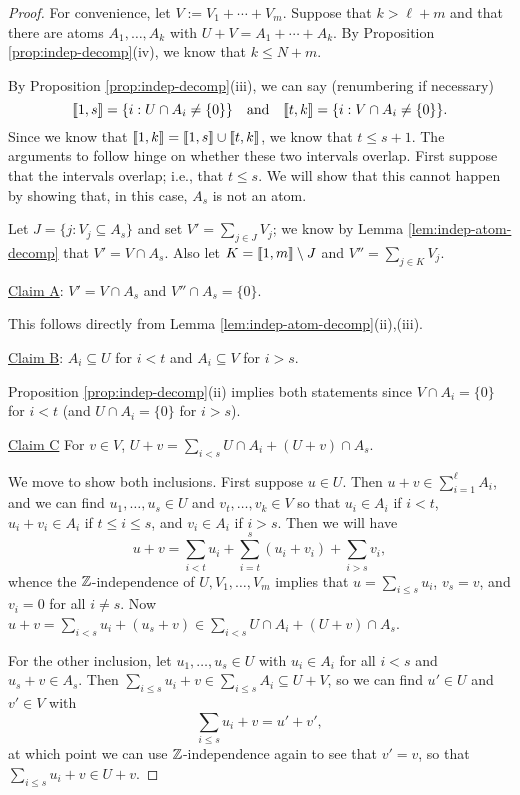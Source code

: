 \begin{proof}
For convenience, let $V := V_1 + \cdots + V_m$.
Suppose that $k > \ell + m$ and that there are atoms $A_1,\dots,A_k$ with $U+V = A_1 + \cdots + A_k$.
By Proposition \ref{prop:indep-decomp}(iv), we know that $k \le N+m$.

By Proposition \ref{prop:indep-decomp}(iii), we can say (renumbering if necessary)
\[ \llbracket 1,s \rrbracket =  \{ i: U\cap A_i \neq\{0\}\} \quad \textrm{and} \quad \llbracket t,k \rrbracket = \{i: V\cap A_i \neq \{0\}\}. \]
Since we know that $\llbracket 1,k \rrbracket = \llbracket 1,s \rrbracket \cup \llbracket t,k \rrbracket$, we know that $t \le s+1$.
The arguments to follow hinge on whether these two intervals overlap.  
First suppose that the intervals overlap; i.e., that $t \le s$.
We will show that this cannot happen by showing that, in this case, $A_s$ is not an atom.

Let $J = \{ j: V_j \subseteq A_s \}$ and set $V' = \sum_{j\in J} V_j$; we know by Lemma \ref{lem:indep-atom-decomp} that $V' = V \cap A_s$.
Also let $K = \llbracket 1,m \rrbracket \setminus J$ and $V'' = \sum_{j\in K} V_j$.

\noindent\underline{Claim A}: $V' = V\cap A_s$ and $V'' \cap A_s = \{0\}$. \label{cla}

This follows directly from Lemma \ref{lem:indep-atom-decomp}(ii),(iii).

\noindent\underline{Claim B}: $A_i \subseteq U$ for $i<t$ and $A_i \subseteq V$ for $i > s$. \label{clb}

Proposition \ref{prop:indep-decomp}(ii) implies both statements since $V \cap A_i = \{0\}$ for $i<t$ (and $U\cap A_i = \{0\}$ for $i>s$).

\noindent\underline{Claim C} For $v\in V$, $U+v = \sum\limits_{i<s} U\cap A_i + (U+v)\cap A_s$. \label{clc}

We move to show both inclusions.
First suppose $u\in U$. 
Then $u+v \in \sum_{i=1}^\ell A_i$, and we can find $u_1,\dots, u_s\in U$ and $v_t,\dots, v_k\in V$ so that
$u_i\in A_i$ if $i < t$, $u_i + v_i \in A_i$ if $t\le i \le s$, and $v_i \in A_i$ if $i > s$.
Then we will have
\[u+v = \sum_{i<t} u_i + \sum_{i=t}^{s} (u_i+v_i) + \sum_{i > s} v_i, \]
whence the $\mathbb{Z}$-independence of $U,V_1,\dots,V_m$ implies that $u = \sum_{i\le s} u_i$, $v_s = v$, and $v_i = 0$ for all $i\neq s$.
Now $u+v = \sum_{i<s} u_i + (u_s+v)\in \sum_{i<s} U\cap A_i + (U+v)\cap A_s$.

For the other inclusion, let $u_1,\dots, u_s\in U$ with $u_i\in A_i$ for all $i<s$ and $u_s + v\in A_s$.
Then $\sum_{i\le s} u_i +v \in \sum_{i\le s} A_i \subseteq U+V$, so we can find $u'\in U$ and $v'\in V$ with 
\[\sum_{i\le s}u_i + v = u' + v',\]
at which point we can use $\mathbb{Z}$-independence again to see that $v' = v$, so that $\sum_{i\le s} u_i + v\in U+v$.


\end{proof}
